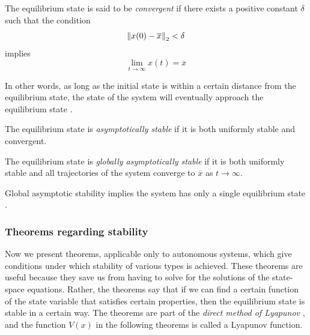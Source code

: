 \begin{definition}
  The equilibrium state is said to be \emph{convergent} if there exists a positive constant $\delta$ such that the condition
  \begin{equation*}
    \left\lVert x(0) - \overline{x} \right\rVert_2 < \delta
  \end{equation*}
  implies
  \begin{equation*}
    \lim_{t \to \infty} x(t) = \overline{x}
  \end{equation*}
  \cite[p. 681]{Haykin:2009:NNC:1213811}
\end{definition}

In other words, as long as the initial state is within a certain distance from the equilibrium state, the state of the system will eventually approach the equilibrium state \cite[p. 681]{Haykin:2009:NNC:1213811}.

\begin{definition}
  The equilibrium state is \emph{asymptotically stable} if it is both uniformly stable and convergent.
  \cite{wilson2010}
\end{definition}

\begin{definition}
  The equilibrium state is \emph{globally asymptotically stable} if it is both uniformly stable and all trajectories of the system converge to $\overline{x}$ as $t \to \infty$.
  \cite{wilson2010}
\end{definition}

Global asymptotic stability implies the system has only a single equilibrium state \cite[p. 681]{Haykin:2009:NNC:1213811}.

\subsubsection{Theorems regarding stability}

Now we present theorems, applicable only to autonomous systems, which give conditions under which stability of various types is achieved. These theorems are useful because they save us from having to solve for the solutions of the state-space equations. Rather, the theorems say that if we can find a certain function of the state variable that satisfies certain properties, then the equilibrium state is stable in a certain way. The theorems are part of the \emph{direct method of Lyapunov} \cite[p. 682]{Haykin:2009:NNC:1213811}, and the function $V(x)$ in the following theorems is called a Lyapunov function.

